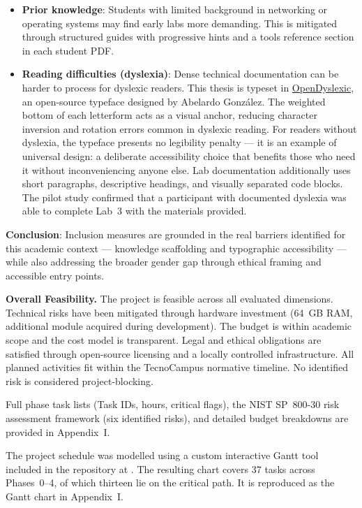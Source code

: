 \begin{itemize}
    \item \textbf{Prior knowledge}: Students with limited background in networking or
          operating systems may find early labs more demanding. This is mitigated through
          structured guides with progressive hints and a tools reference section
          in each student PDF.

    \item \textbf{Reading difficulties (dyslexia)}: Dense technical documentation
          can be harder to process for dyslexic readers. This thesis is typeset in
          \href{https://opendyslexic.org}{OpenDyslexic}, an open-source typeface
          designed by Abelardo Gonz\'{a}lez. The weighted bottom of each letterform
          acts as a visual anchor, reducing character inversion and rotation errors
          common in dyslexic reading. For readers without dyslexia, the typeface
          presents no legibility penalty --- it is an example of universal design:
          a deliberate accessibility choice that benefits those who need it without
          inconveniencing anyone else. Lab documentation additionally uses short
          paragraphs, descriptive headings, and visually separated code blocks.
          The pilot study confirmed that a participant with documented dyslexia
          was able to complete Lab~3 with the materials provided.
\end{itemize}
\newpage
\textbf{Conclusion}: Inclusion measures are grounded in the real barriers identified
for this academic context --- knowledge scaffolding and typographic accessibility ---
while also addressing the broader gender gap through ethical framing and accessible
entry points.

\medskip
\textbf{Overall Feasibility.} The project is feasible across all evaluated dimensions. Technical risks have been
mitigated through hardware investment (64~GB RAM, additional module acquired during
development). The budget is within academic scope and the cost model is transparent.
Legal and ethical obligations are satisfied through open-source licensing and a locally
controlled infrastructure. All planned activities fit within the TecnoCampus normative
timeline. No identified risk is considered project-blocking.

Full phase task lists (Task IDs, hours, critical flags), the NIST SP~800-30 risk assessment framework (six identified risks), and detailed budget breakdowns are provided in Appendix~I.

The project schedule was modelled using a custom interactive Gantt tool included in the repository at . The resulting chart covers 37 tasks across Phases~0--4, of which thirteen lie on the critical path. It is reproduced as the Gantt chart in Appendix~I.
